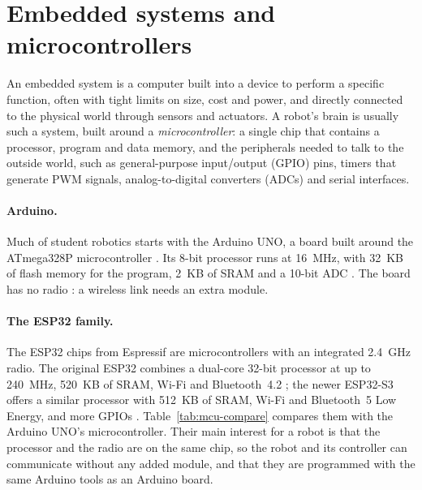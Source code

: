 \section{Embedded systems and microcontrollers}
\label{sec:mcu}
An embedded system is a computer built into a device to perform a specific function, often
with tight limits on size, cost and power, and directly connected to the physical world
through sensors and actuators. A robot's brain is usually such a system, built around a
\emph{microcontroller}: a single chip that contains a processor, program and data memory,
and the peripherals needed to talk to the outside world, such as general-purpose
input/output (GPIO) pins, timers that generate PWM signals, analog-to-digital converters
(ADCs) and serial interfaces.

\paragraph{Arduino.} Much of student robotics starts with the Arduino UNO, a board built
around the ATmega328P microcontroller \cite{arduino_uno}. Its 8-bit processor runs at
16~MHz, with 32~KB of flash memory for the program, 2~KB of SRAM and a 10-bit ADC
\cite{atmega328p_datasheet}. The board has no radio \cite{arduino_uno}: a wireless link
needs an extra module.

\paragraph{The ESP32 family.} The ESP32 chips from Espressif are microcontrollers with an
integrated 2.4~GHz radio. The original ESP32 combines a dual-core 32-bit processor at up to
240~MHz, 520~KB of SRAM, Wi-Fi and Bluetooth~4.2 \cite{esp32_datasheet}; the newer ESP32-S3
offers a similar processor with 512~KB of SRAM, Wi-Fi and Bluetooth~5 Low Energy, and more
GPIOs \cite{esp32s3_datasheet}. Table~\ref{tab:mcu-compare} compares them with the Arduino
UNO's microcontroller. Their main interest for a robot is that the processor and the radio
are on the same chip, so the robot and its controller can communicate without any added
module, and that they are programmed with the same Arduino tools as an Arduino board.

